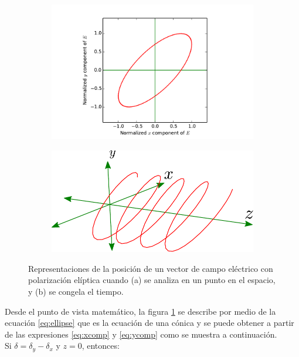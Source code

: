 \begin{figure}[h!]
\centering
\begin{subfigure}{.45\textwidth}
  \centering
  \includegraphics[width=1\linewidth]{ellipse_clean}
  \caption{}
\label{fig:ellipse_clean}
\end{subfigure}\qquad
\begin{subfigure}{.45\textwidth}
  \centering
  \includegraphics[width=.8\linewidth]{trayectory_clean}
  \caption{}
  \label{fig:trayectory_clean}
\end{subfigure}
\caption[Distintas representaciones del campo eléctrico para ilustrar
la polarización]{Representaciones de la posición de un vector de campo
  eléctrico con polarización elíptica cuando (a) se analiza en un
  punto en el espacio, y (b) se  congela el tiempo.} 
\label{fig:general_field}
\end{figure} 

Desde el punto de vista matemático, la figura
\ref{fig:ellipse_clean} se describe por medio de la ecuación
\ref{eq:ellipse} que es la ecuación de una cónica y se puede obtener
a partir de las expresiones \ref{eq:xcomp} y \ref{eq:ycomp} como se
muestra a continuación.\\ Si $\delta = \delta_y-\delta_x$ y $z=0$,
entonces:

